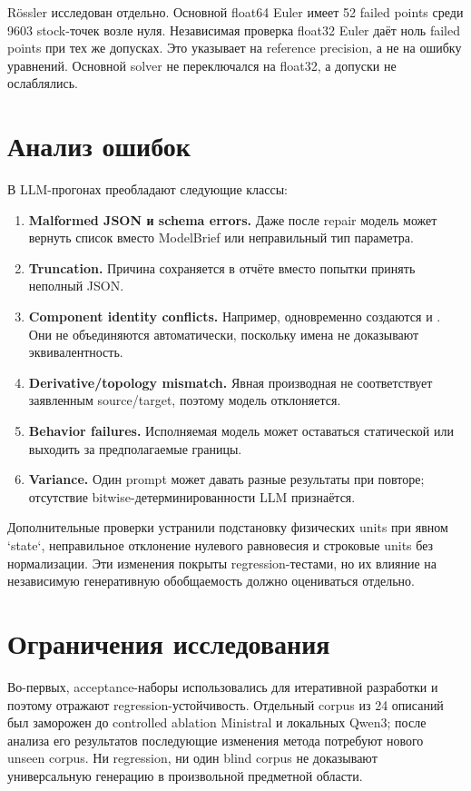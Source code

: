 Rössler исследован отдельно. Основной float64 Euler имеет 52 failed points среди 9603 stock-точек возле нуля. Независимая проверка float32 Euler даёт ноль failed points при тех же допусках. Это указывает на reference precision, а не на ошибку уравнений. Основной solver не переключался на float32, а допуски не ослаблялись.

\section{Анализ ошибок}

В LLM-прогонах преобладают следующие классы:

\begin{enumerate}
    \item \textbf{Malformed JSON и schema errors.} Даже после repair модель может вернуть список вместо ModelBrief или неправильный тип параметра.
    \item \textbf{Truncation.} Причина  сохраняется в отчёте вместо попытки принять неполный JSON.
    \item \textbf{Component identity conflicts.} Например, одновременно создаются  и . Они не объединяются автоматически, поскольку имена не доказывают эквивалентность.
    \item \textbf{Derivative/topology mismatch.} Явная производная не соответствует заявленным source/target, поэтому модель отклоняется.
    \item \textbf{Behavior failures.} Исполняемая модель может оставаться статической или выходить за предполагаемые границы.
    \item \textbf{Variance.} Один prompt может давать разные результаты при повторе; отсутствие bitwise-детерминированности LLM признаётся.
\end{enumerate}

Дополнительные проверки устранили подстановку физических units при явном `state`, неправильное отклонение нулевого равновесия и строковые units без нормализации. Эти изменения покрыты regression-тестами, но их влияние на независимую генеративную обобщаемость должно оцениваться отдельно.

\section{Ограничения исследования}

Во-первых, acceptance-наборы использовались для итеративной разработки и поэтому отражают regression-устойчивость. Отдельный corpus из 24 описаний был заморожен до controlled ablation Ministral и локальных Qwen3; после анализа его результатов последующие изменения метода потребуют нового unseen corpus. Ни regression, ни один blind corpus не доказывают универсальную генерацию в произвольной предметной области.

